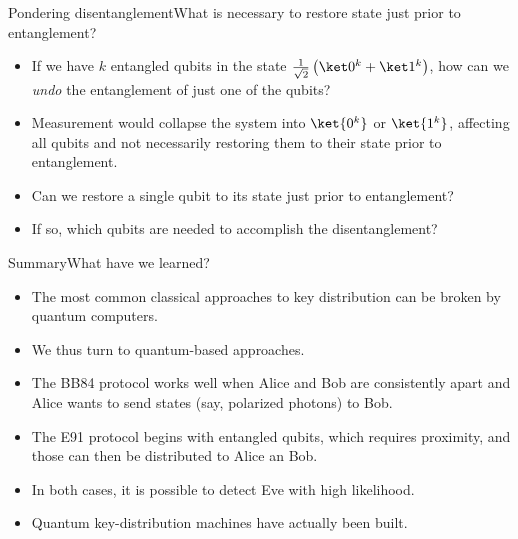 \begin{frame}{Pondering disentanglement}{What is necessary to restore state just prior to entanglement?}

\begin{itemize}
    \item If we have $k$ entangled qubits in the state $\TwoSup{0^{k}}{1^{k}}$, how can we \emph{undo} the entanglement of just one of the qubits?
    \item Measurement would collapse the system into $\ket{0^k}$ or $\ket{1^k}$, affecting all qubits and not necessarily restoring them to their state prior to entanglement.
    \item Can we restore a single qubit to its state just prior to entanglement?
    \item If so, which qubits are needed to accomplish the disentanglement?
\end{itemize}
    
\end{frame}

\begin{frame}{Summary}{What have we learned?}
\begin{itemize}
    \item The most common classical approaches to key distribution can be broken by quantum computers.
    \item We thus turn to quantum-based approaches.
    \item The BB84 protocol works well when Alice and Bob are consistently apart and Alice wants to send states (say, polarized photons) to Bob.
    \item The E91 protocol begins with entangled qubits, which requires proximity, and those can then be distributed to Alice an Bob.
    \item In both cases, it is possible to detect Eve with high likelihood.
    \item Quantum key-distribution machines have actually been built.
\end{itemize}
\end{frame}
